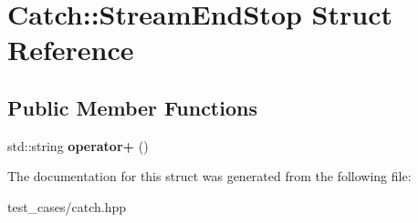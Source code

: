 \hypertarget{structCatch_1_1StreamEndStop}{}\section{Catch\+:\+:Stream\+End\+Stop Struct Reference}
\label{structCatch_1_1StreamEndStop}
\subsection*{Public Member Functions}
\begin{DoxyCompactItemize}
\item 
\mbox{\label{structCatch_1_1StreamEndStop_a3025092e06c224e0845f2caa07b26d0e}} 
std\+::string {\bfseries operator+} ()
\end{DoxyCompactItemize}


The documentation for this struct was generated from the following file\+:\begin{DoxyCompactItemize}
\item 
test\+\_\+cases/catch.\+hpp\end{DoxyCompactItemize}
